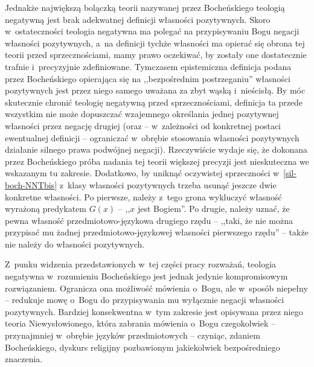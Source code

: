 Jednakże największą bolączką teorii nazywanej przez Bocheńskiego teologią negatywną jest brak adekwatnej definicji własności pozytywnych. Skoro w~ostateczności teologia negatywna ma polegać na przypisywaniu Bogu negacji własności pozytywnych, a~na definicji tychże własności ma opierać się obrona tej teorii przed sprzecznościami, mamy prawo oczekiwać, by zostały one dostatecznie trafnie i~precyzyjnie zdefiniowane. Tymczasem epistemiczna definicja podana przez Bocheńskiego opierająca się na ,,bezpośrednim postrzeganiu'' własności pozytywnych jest przez niego samego uważana za zbyt wąską i~nieścisłą. By móc skutecznie chronić teologię negatywną przed sprzecznościami, definicja ta przede wszystkim nie może dopuszczać wzajemnego określania jednej pozytywnej własności przez negację drugiej (oraz -- w~zależności od konkretnej postaci ewentualnej definicji -- ograniczać w~obrębie stosowania własności pozytywnych działanie silnego prawa podwójnej negacji). Rzeczywiście wydaje się, że dokonana przez Bocheńskiego próba nadania tej teorii większej precyzji jest nieskuteczna we wskazanym tu zakresie. Dodatkowo, by uniknąć oczywistej sprzeczności w~\ref{sil-boch-NNTbis} z~klasy własności pozytywnych trzeba usunąć jeszcze dwie konkretne własności. Po pierwsze, należy z~tego grona wykluczyć własność wyrażoną predykatem $G(x)$ -- ,,$x$ jest Bogiem''. Po drugie, należy uznać, że pewna własność przedmiotowo-językowa drugiego rzędu -- ,,taki, że nie można przypisać mu żadnej przedmiotowo-językowej własności pierwszego rzędu'' -- także nie należy do własności pozytywnych.

Z~punku widzenia przedstawionych w~tej części pracy rozważań, teologia negatywna w~rozumieniu Bocheńskiego jest jednak jedynie kompromisowym rozwiązaniem. Ogranicza ona możliwość mówienia o~Bogu, ale w~sposób niepełny -- redukuje mowę o~Bogu do przypisywania mu wyłącznie negacji własności pozytywnych. Bardziej konsekwentna w~tym zakresie jest opisywana przez niego teoria Niewysłowionego, która zabrania mówienia o~Bogu czegokolwiek -- przynajmniej w~obrębie języków przedmiotowych -- czyniąc, zdaniem Bocheńskiego, dyskurs religijny pozbawionym jakiekolwiek bezpośredniego znaczenia.

